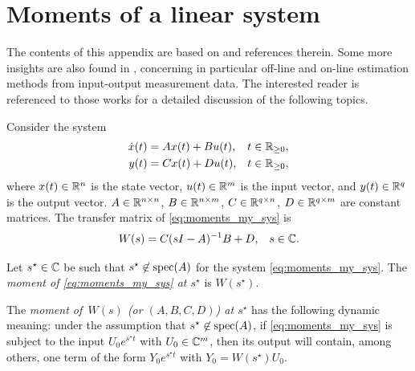 \chapter{Moments of a linear system}
\label{app:moments}
\vspace{-1.3cm}

The contents of this appendix are based on \cite{astolfi_model_2010,scarciotti_data-driven_2017} and references therein. Some more insights are also found in \cite{carnevale_external_2017,carnevale_data_2021}, concerning in particular off-line and on-line estimation methods from input-output measurement data. The interested reader is referenced to those works for a detailed discussion of the following topics.

Consider the system
\begin{subequations}
  \label{eq:moments_my_sys}
	\begin{align}
		\dot{x}(t) & = Ax(t)+Bu(t), & t\in\mathbb{R}_{\geq 0}, \\
		y(t)       & = Cx(t)+Du(t), & t\in\mathbb{R}_{\geq 0},
	\end{align}
\end{subequations}
where $x(t)\in\mathbb{R}^n$ is the state vector, $u(t)\in\mathbb{R}^m$ is the input vector, and $y(t)\in\mathbb{R}^q$ is the output vector. $A\in\mathbb{R}^{n\times n}$, $B\in\mathbb{R}^{n\times m}$, $C\in\mathbb{R}^{q\times n}$, $D\in\mathbb{R}^{q\times m}$ are constant matrices.
The transfer matrix of \eqref{eq:moments_my_sys} is
\begin{align}
  \label{eq:moments_my_sys_W}
	W(s) &= C(sI-A)^{-1}B+D, & s\in\mathbb{C}.
\end{align}

\begin{definition}[Moment]
  \label{def:moment}
	Let $s^{\star}\in\mathbb{C}$ be such that
	$s^{\star}\not\in\operatorname{spec}(A)$ for the system \eqref{eq:moments_my_sys}.
	The \emph{moment of \eqref{eq:moments_my_sys} at $s^{\star}$}
	is $W(s^{\star})$.\closestatement
\end{definition}

The \emph{moment of $\,W(s)$ (or $(A,B,C,D)$) at $s^{\star}$}
has the following dynamic meaning:
under the assumption that $s^{\star}\not\in\operatorname{spec}(A)$,
if \eqref{eq:moments_my_sys} is subject to the
input $U_0 e^{s^{\star}t}$ with $U_0 \in\mathbb{C}^m$,
then its output will contain, among others, one term of the form
$Y_0 e^{s^{\star}t}$ with $Y_0=W(s^{\star})U_0 $.

